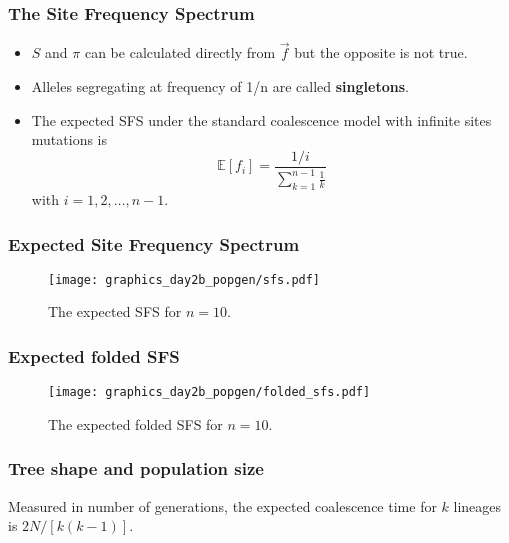 \documentclass{beamer}
\newcommand{\E}{\mathbb{E}}
\newcommand{\1}{\ensuremath{\mathbf{1}}}
\begin{document}
%
%
%
\begin{frame}\frametitle{The Site Frequency Spectrum}
	\begin{itemize}
		\item $S$ and $\pi$ can be calculated directly from $\vec{f}$ but the opposite is not true.
		\item Alleles segregating at frequency of 1/n are called \textbf{singletons}.
		\item The expected SFS under the standard coalescence model with
infinite sites mutations is
			\begin{equation}
				\E[f_i] = \frac{1/i}{\sum_{k=1}^{n-1}\tfrac{1}{k}}
			\end{equation}
			with $i = 1,2,\ldots,n-1$.
	\end{itemize}
\end{frame}
%
%
%
\begin{frame}\frametitle{Expected Site Frequency Spectrum}
	\begin{figure}
	\begin{center}
		\texttt{[image: graphics\_day2b\_popgen/sfs.pdf]}
	\end{center}
	\caption{The expected SFS for $n=10$.}
	\end{figure}
\end{frame}
%
%
%
\begin{frame}\frametitle{Expected folded SFS}
	\begin{figure}
	\begin{center}
		\texttt{[image: graphics\_day2b\_popgen/folded\_sfs.pdf]}
	\end{center}
	\caption{The expected folded SFS for $n=10$.}
	\end{figure}
\end{frame}
%
%
%
\begin{frame}\frametitle{Tree shape and population size}
	Measured in number of generations, the expected coalescence time for $k$ lineages is $2N/[k(k - 1)]$.
	\begin{center}
	\end{center}
\end{frame}
\end{document}
